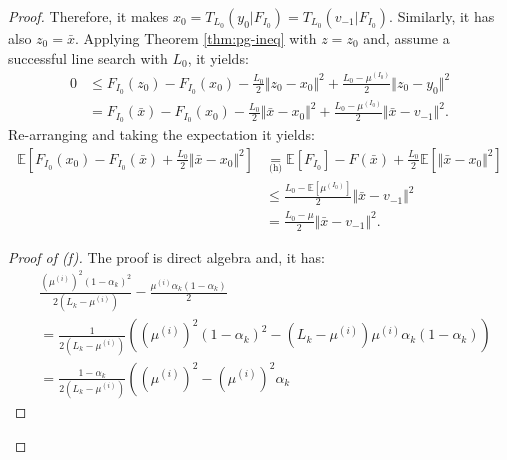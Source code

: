 \documentclass[12pt]{article}
\begin{document}
\begin{proof}
            Therefore, it makes $x_0 = T_{L_0}(y_0 | F_{I_0}) = T_{L_0}(v_{-1} | F_{I_0})$. 
            Similarly, it has also $z_0 = \bar x$.
            Applying Theorem \ref{thm:pg-ineq} with $z = z_0$ and, assume a successful line search with $L_0$, it yields: 
            \begin{align*}
                0 &\le F_{I_0}(z_0) - F_{I_0}(x_0) - \frac{L_0}{2}\Vert z_0 - x_0\Vert^2 + \frac{L_0 - \mu^{(I_0)}}{2}\Vert z_0 - y_0\Vert^2
                \\
                &= F_{I_0}(\bar x) - F_{I_0}(x_0) - \frac{L_0}{2}\Vert \bar x - x_0\Vert^2 + \frac{L_0 - \mu^{(I_0)}}{2}\Vert \bar x - v_{-1}\Vert^2. 
            \end{align*}
            Re-arranging and taking the expectation it yields: 
            \begin{align*}
                \mathbb E \left[
                    F_{I_0}(x_0) - F_{I_0}(\bar x) + \frac{L_0}{2}\Vert \bar x - x_0\Vert^2
                \right]
                &\underset{\text{(h)}}{=}
                \mathbb E \left[ F_{I_0}\right] - F(\bar x) 
                + \frac{L_0}{2}\mathbb E \left[\Vert \bar x - x_0\Vert^2\right]
                \\
                &\le \frac{L_0 - \mathbb E \left[\mu^{(I_0)}\right]}{2}\Vert \bar x - v_{-1}\Vert^2
                \\
                &= \frac{L_0 - \mu}{2}\Vert \bar x - v_{-1}\Vert^2. 
            \end{align*}
            \begin{proof}[Proof of (f)]
                The proof is direct algebra and, it has: 
                {\small\allowdisplaybreaks
                \begin{align*}
                    & \frac{\left(\mu^{(i)}\right)^2(1 - \alpha_k)^2}{2(L_k - \mu^{(i)})} 
                    - \frac{\mu^{(i)}\alpha_k(1 - \alpha_k)}{2}
                    \\
                    &= 
                    \frac{1}{2\left(L_k - \mu^{(i)}\right)}
                    \left(
                        \left(\mu^{(i)}\right)^2(1 - \alpha_k)^2
                        - \left(L_k - \mu^{(i)}\right)\mu^{(i)} \alpha_k(1 - \alpha_k)
                    \right)
                    \\
                    &= \frac{1 - \alpha_k}{2\left(L_k - \mu^{(i)}\right)}\left(
                        \left(\mu^{(i)}\right)^2 
                        - \left(\mu^{(i)}\right)^2\alpha_k 

\end{align*}}
\end{proof}
\end{proof}
\end{document}
